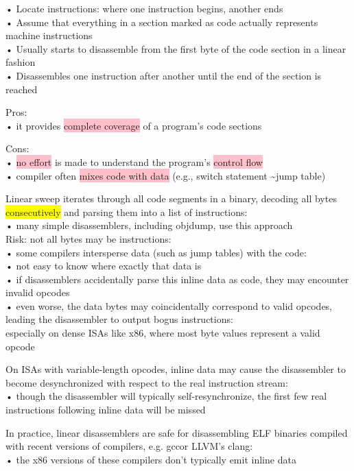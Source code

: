 \documentclass[]{project_plan}
\begin{document}
• Locate instructions: where one instruction begins, another ends\\
• Assume that everything in a section marked as code actually represents machine instructions\\
• Usually starts to disassemble from the first byte of the code section in a linear fashion\\
• Disassembles one instruction after another until the end of the section is reached

Pros:\\
• it provides \colorbox{pink}{complete coverage} of a program’s code sections

Cons:\\
• \colorbox{pink}{no effort} is made to understand the program’s \colorbox{pink}{control flow}\\
• compiler often \colorbox{pink}{mixes code with data} (e.g., switch statement \textasciitilde jump table)

Linear sweep iterates through all code segments in a binary, decoding all bytes
\colorbox{yellow}{consecutively} and parsing them into a list of instructions:\\
• many simple disassemblers, including objdump, use this approach\\

Risk: not all bytes may be instructions:\\
• some compilers intersperse data (such as jump tables) with the code:\\
• not easy to know where exactly that data is\\
• if disassemblers accidentally parse this inline data as code, they may encounter invalid opcodes\\
• even worse, the data bytes may coincidentally correspond to valid opcodes, leading the
disassembler to output bogus instructions:\\
especially on dense ISAs like x86, where most byte values represent a valid opcode

On ISAs with variable-length opcodes, inline data may cause the disassembler to become
desynchronized with respect to the real instruction stream:\\
• though the disassembler will typically self-resynchronize, the first few real instructions
following inline data will be missed

In practice, linear disassemblers are safe for disassembling ELF binaries compiled
with recent versions of compilers, e.g. gccor LLVM’s clang:\\
• the x86 versions of these compilers don’t typically emit inline data
\end{document}
